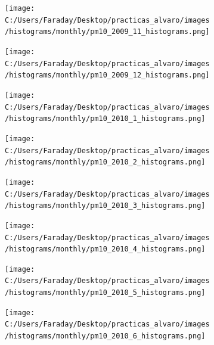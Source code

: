 \documentclass[12pt]{article}
\begin{document}
\begin{figure}[H]
\centering
\begin{subfigure}[h]{0.45\textwidth}
\texttt{[image: C:/Users/Faraday/Desktop/practicas\_alvaro/images/histograms/monthly/pm10\_2009\_11\_histograms.png]}
\caption{}
\label{fig:hist-mon-3-11-2009}
\end{subfigure}
%
\begin{subfigure}[H]{0.45\textwidth}
\texttt{[image: C:/Users/Faraday/Desktop/practicas\_alvaro/images/histograms/monthly/pm10\_2009\_12\_histograms.png]}
\caption{}
\label{fig:hist-mon-3-12-2009}
\end{subfigure}
\caption{}
\end{figure}

\newpage

\begin{figure}[H]
\centering
\begin{subfigure}[h]{0.45\textwidth}
\texttt{[image: C:/Users/Faraday/Desktop/practicas\_alvaro/images/histograms/monthly/pm10\_2010\_1\_histograms.png]}
\caption{}
\label{fig:hist-mon-3-1-2010}
\end{subfigure}
%
\begin{subfigure}[H]{0.45\textwidth}
\texttt{[image: C:/Users/Faraday/Desktop/practicas\_alvaro/images/histograms/monthly/pm10\_2010\_2\_histograms.png]}
\caption{}
\label{fig:hist-mon-3-2-2010}
\end{subfigure}
\caption{}
\end{figure}

\begin{figure}[H]
\centering
\begin{subfigure}[h]{0.45\textwidth}
\texttt{[image: C:/Users/Faraday/Desktop/practicas\_alvaro/images/histograms/monthly/pm10\_2010\_3\_histograms.png]}
\caption{}
\label{fig:hist-mon-3-3-2010}
\end{subfigure}
%
\begin{subfigure}[H]{0.45\textwidth}
\texttt{[image: C:/Users/Faraday/Desktop/practicas\_alvaro/images/histograms/monthly/pm10\_2010\_4\_histograms.png]}
\caption{}
\label{fig:hist-mon-3-4-2010}
\end{subfigure}
\caption{}
\end{figure}

\begin{figure}[H]
\centering
\begin{subfigure}[h]{0.45\textwidth}
\texttt{[image: C:/Users/Faraday/Desktop/practicas\_alvaro/images/histograms/monthly/pm10\_2010\_5\_histograms.png]}
\caption{}
\label{fig:hist-mon-3-5-2010}
\end{subfigure}
%
\begin{subfigure}[H]{0.45\textwidth}
\texttt{[image: C:/Users/Faraday/Desktop/practicas\_alvaro/images/histograms/monthly/pm10\_2010\_6\_histograms.png]}
\caption{}
\label{fig:hist-mon-3-6-2010}
\end{subfigure}
\caption{}
\end{figure}
\end{document}

